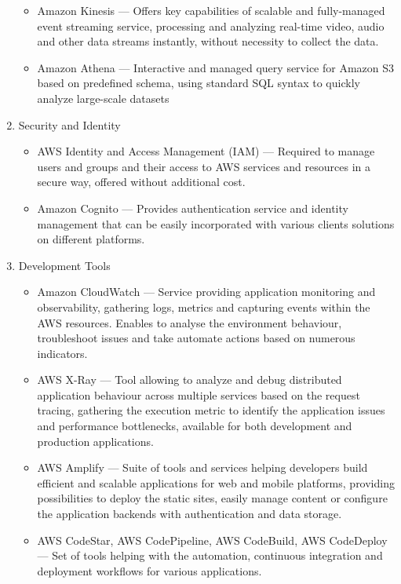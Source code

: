 \begin{enumerate}
   \begin{itemize}
       \item Amazon Kinesis --- Offers key capabilities of scalable and fully-managed event streaming service, processing and analyzing real-time video, audio and other data streams instantly, without necessity to collect the data.
       \item Amazon Athena --- Interactive and managed query service for Amazon S3 based on predefined schema, using standard SQL syntax to quickly analyze large-scale datasets
   \end{itemize}
   \item Security and Identity
   \begin{itemize}
       \item AWS Identity and Access Management (IAM) --- Required to manage users and groups and their access to AWS services and resources in a secure way, offered without additional cost.
       \item Amazon Cognito --- Provides authentication service and identity management that can be easily incorporated with various clients solutions on different platforms.
   \end{itemize}
   \item Development Tools
   \begin{itemize}
       \item Amazon CloudWatch --- Service providing application monitoring and observability, gathering logs, metrics and capturing events within the AWS resources. Enables to analyse the environment behaviour, troubleshoot issues and take automate actions based on numerous indicators.
       \item AWS X-Ray --- Tool allowing to analyze and debug distributed application behaviour across multiple services based on the request tracing, gathering the execution metric to identify the application issues and performance bottlenecks, available for both development and production applications.
       \item AWS Amplify --- Suite of tools and services helping developers build efficient and scalable applications for web and mobile platforms, providing possibilities to deploy the static sites, easily manage content or configure the application backends with authentication and data storage.
       \item AWS CodeStar, AWS CodePipeline, AWS CodeBuild, AWS CodeDeploy --- Set of tools helping with the automation, continuous integration and deployment workflows for various applications.
   \end{itemize}
\end{enumerate}


